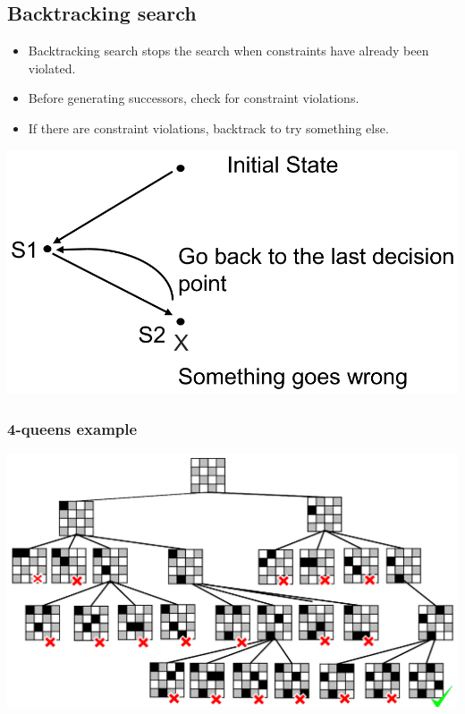 \documentclass[11pt]{article}
\begin{document}
\subsection{Backtracking search}
\label{sec:orgcb6fe88}
\begin{itemize}
\item Backtracking search stops the search when constraints have already been violated.
\item Before generating successors, check for constraint violations.
\item If there are constraint violations, backtrack to try something else.
\end{itemize}

\begin{center}
\includegraphics[width=.9\linewidth]{./images/backtracking-search-diagram.png}
\end{center}
\subsubsection{4-queens example}
\label{sec:org59b4b18}
\begin{center}
\includegraphics[width=.9\linewidth]{./images/4-queens-example.png}
\end{center}
\end{document}
